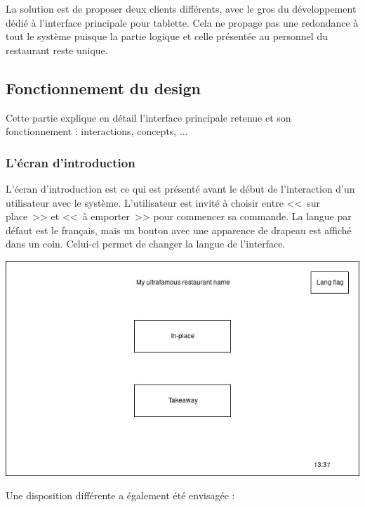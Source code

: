 \documentclass[a4paper,12pt]{article}
\begin{document}
La solution est de proposer deux clients différents, avec le gros du développement dédié à l'interface principale
pour tablette. Cela ne propage pas une redondance à tout le système puisque la partie logique et celle présentée
au personnel du restaurant reste unique.

\subsection{Fonctionnement du design}

Cette partie explique en détail l'interface principale retenue et son fonctionnement : interactions, concepts, ...

\subsubsection{L'écran d'introduction}

L'écran d'introduction est ce qui est présenté avant le début de l'interaction d'un utilisateur avec le système.
L'utilisateur est invité à choisir entre <<~sur place~>> et <<~à emporter~>> pour commencer sa commande. La langue par
défaut est le français, mais un bouton avec une apparence de drapeau est affiché dans un coin. Celui-ci permet de
changer la langue de l'interface.

\begin{center}
	\includegraphics[width=\textwidth]{intro_screen.jpg}
\end{center}

Une disposition différente a également été envisagée :
\end{document}
